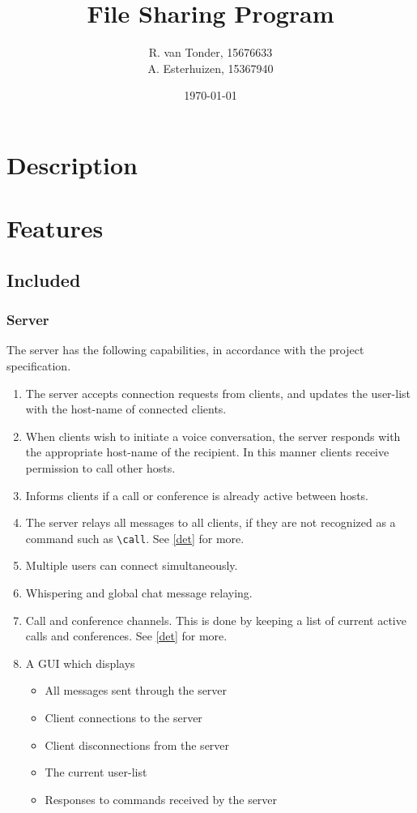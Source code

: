 \documentclass[10pt,a4paper]{article}
\title{File Sharing Program}
\author{R. van Tonder, 15676633 \\ A. Esterhuizen, 15367940}
\date{\today}
\begin{document}
\maketitle
\newpage
\tableofcontents
\newpage

\section{Description}
\paragraph{} 

\section{Features}
\subsection{Included}
\subsubsection{Server}
The server has the following capabilities, in accordance with the
project specification.

\begin{enumerate}
 \item The server accepts connection requests from clients, and updates the user-list with the host-name of connected clients.
 \item When clients wish to initiate a voice conversation, the server responds with the appropriate host-name of the recipient. 
In this manner clients receive permission to call other hosts.
 \item Informs clients if a call or conference is already active between hosts.
 \item The server relays all messages to all clients, if they are not recognized as a command such as \verb|\call|. See \ref{det} for more.
 \item Multiple users can connect simultaneously.
 \item Whispering and global chat message relaying.
 \item Call and conference channels. This is done by keeping a list of current active calls and conferences. See \ref{det} for more.
 \item A GUI which displays 
 \begin{itemize}
  \item All messages sent through the server
  \item Client connections to the server
  \item Client disconnections from the server
  \item The current user-list
  \item Responses to commands received by the server
 \end{itemize}

\end{enumerate}
\end{document}
